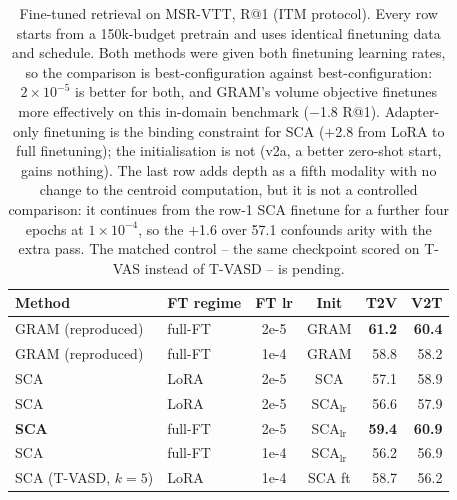 \begin{table}[t]
\centering
\caption{Fine-tuned retrieval on MSR-VTT, R@1 (ITM protocol). Every row starts from a
150k-budget pretrain and uses identical finetuning data and schedule. Both methods were
given both finetuning learning rates, so the comparison is best-configuration against
best-configuration: $2\!\times\!10^{-5}$ is better for both, and GRAM's volume objective
finetunes more effectively on this in-domain benchmark ($-$1.8 R@1). Adapter-only
finetuning is the binding constraint for SCA ($+$2.8 from LoRA to full finetuning); the
initialisation is not (v2a, a better zero-shot start, gains nothing). The last row adds
depth as a fifth modality with no change to the centroid computation, but it is not a
controlled comparison: it continues from the row-1 SCA finetune for a further four epochs
at $1\!\times\!10^{-4}$, so the $+$1.6 over 57.1 confounds arity with the extra pass. The
matched control -- the same checkpoint scored on T-VAS instead of T-VASD -- is pending.}
\label{tab:finetune}
\small
\setlength{\tabcolsep}{5pt}
\begin{tabular}{llccrr}
\toprule
Method & FT regime & FT lr & Init & T2V & V2T \\
\midrule
GRAM (reproduced) & full-FT & 2e-5 & GRAM & \textbf{61.2} & \textbf{60.4} \\
GRAM (reproduced) & full-FT & 1e-4 & GRAM & 58.8 & 58.2 \\
\midrule
SCA & LoRA & 2e-5 & SCA & 57.1 & 58.9 \\
SCA & LoRA & 2e-5 & SCA$_{\text{lr}}$ & 56.6 & 57.9 \\
\textbf{SCA} & full-FT & 2e-5 & SCA$_{\text{lr}}$ & \textbf{59.4} & \textbf{60.9} \\
SCA & full-FT & 1e-4 & SCA$_{\text{lr}}$ & 56.2 & 56.9 \\
\midrule
SCA (T-VASD, $k{=}5$) & LoRA & 1e-4 & SCA ft & 58.7 & 56.2 \\
\bottomrule
\end{tabular}
\end{table}
